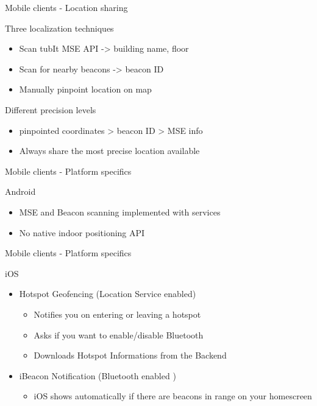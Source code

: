 \documentclass[11pt]{beamer}
\begin{document}
\begin{frame}{Mobile clients - Location sharing}

  Three localization techniques
  \begin{itemize}
    \item Scan tubIt MSE API -> building name, floor
    \item Scan for nearby beacons -> beacon ID
    \item Manually pinpoint location on map
  \end{itemize}
  \bigskip
  Different precision levels
  \begin{itemize}
    \item pinpointed coordinates > beacon ID > MSE info
    \item Always share the most precise location available
  \end{itemize}

\end{frame}


\begin{frame}{Mobile clients - Platform specifics}

  Android

  \begin{itemize}

    \item MSE and Beacon scanning implemented with services
    \item No native indoor positioning API

  \end{itemize}

\end{frame}


\begin{frame}{Mobile clients - Platform specifics}

  iOS

  \begin{itemize}

    \item Hotspot Geofencing (Location Service enabled)
    \begin{itemize}
         \item Notifies you on entering or leaving a hotspot
         \item Asks if you want to enable/disable Bluetooth
         \item Downloads Hotspot Informations from the Backend
     \end{itemize}

    \item iBeacon Notification (Bluetooth enabled )
    \begin{itemize}
         \item iOS shows automatically if there are beacons in range on your homescreen

     \end{itemize}

  \end{itemize}

\end{frame}
\end{document}
